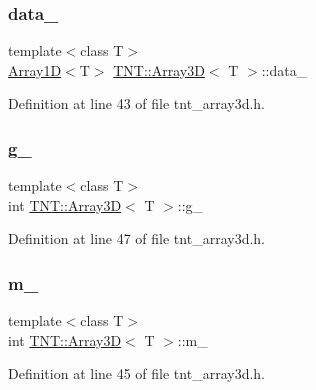 \subsubsection{\texorpdfstring{data\+\_\+}{data\_}}
{\footnotesize\ttfamily template$<$class T$>$ \\
\hyperlink{classTNT_1_1Array1D}{Array1D}$<$T$>$ \hyperlink{classTNT_1_1Array3D}{T\+N\+T\+::\+Array3D}$<$ T $>$\+::data\+\_\+\hspace{0.3cm}{\ttfamily [private]}}



Definition at line 43 of file tnt\+\_\+array3d.\+h.

\mbox{\label{classTNT_1_1Array3D_a9de3f7ac51695d316851a2a67611d5d3}} 
\subsubsection{\texorpdfstring{g\+\_\+}{g\_}}
{\footnotesize\ttfamily template$<$class T$>$ \\
int \hyperlink{classTNT_1_1Array3D}{T\+N\+T\+::\+Array3D}$<$ T $>$\+::g\+\_\+\hspace{0.3cm}{\ttfamily [private]}}



Definition at line 47 of file tnt\+\_\+array3d.\+h.

\mbox{\label{classTNT_1_1Array3D_a92608cdff3277ba6169b84586d6239bb}} 
\subsubsection{\texorpdfstring{m\+\_\+}{m\_}}
{\footnotesize\ttfamily template$<$class T$>$ \\
int \hyperlink{classTNT_1_1Array3D}{T\+N\+T\+::\+Array3D}$<$ T $>$\+::m\+\_\+\hspace{0.3cm}{\ttfamily [private]}}



Definition at line 45 of file tnt\+\_\+array3d.\+h.

\mbox{\label{classTNT_1_1Array3D_a09744b9ba04f2a36450b079dd16d1a0b}} 
